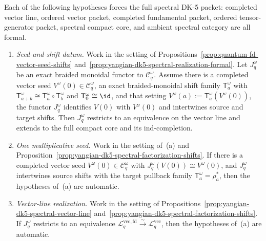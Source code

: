 \begin{corollary}
\label{cor:yangian-dk5-spectral-seed-realization}%
\label{cor:yangian-dk5-spectral-one-seed}%
\label{cor:yangian-dk5-spectral-factorization-vector-line}%
\label{cor:yangian-dk5-spectral-factorization-ambient-vector-line}%
Each of the following hypotheses forces the full spectral DK-5 packet:
completed vector line, ordered vector packet, completed fundamental
packet, ordered tensor-generator packet, spectral compact core, and
ambient spectral category are all formal.
\begin{enumerate}[label=\textup{(\alph*)}]
\item\emph{Seed-and-shift datum.}
  Work in the setting of
  Propositions~\ref{prop:quantum-fd-vector-seed-shifts}
  and~\ref{prop:yangian-dk5-spectral-realization-formal}.  Let
  \(J_q^\omega\) be an exact braided monoidal functor to
  \(\mathcal{C}_q^\omega\).  Assume there is a completed vector seed
  \(V^\omega(0)\in \mathcal{C}_q^\omega\), an exact braided-monoidal
  shift family \(\mathsf{T}_a^\omega\) with
  \(\mathsf{T}_{a+b}^\omega\cong
  \mathsf{T}_a^\omega\circ \mathsf{T}_b^\omega\) and
  \(\mathsf{T}_0^\omega\cong \id\), and that setting
  \(V^\omega(a):=\mathsf{T}_a^\omega(V^\omega(0))\), the functor
  \(J_q^\omega\) identifies \(V(0)\) with \(V^\omega(0)\) and
  intertwines source and target shifts.  Then \(J_q^\omega\) restricts
  to an equivalence on the vector line and extends to the full compact
  core and its ind-completion.

\item\emph{One multiplicative seed.}
  Work in the setting of~\textup{(a)} and
  Proposition~\ref{prop:yangian-dk5-spectral-factorization-shifts}.
  If there is a completed vector seed
  \(V^\omega(0)\in \mathcal C_q^\omega\) with
  \(J_q^\omega(V(0))\cong V^\omega(0)\), and \(J_q^\omega\)
  intertwines source shifts with the target pullback family
  \(\mathsf T_a^\omega=\rho_a^*\), then the hypotheses
  of~\textup{(a)} are automatic.

\item\emph{Vector-line realization.}
  Work in the setting of
  Propositions~\ref{prop:yangian-dk5-spectral-vector-line}
  and~\ref{prop:yangian-dk5-spectral-factorization-shifts}.
  If \(J_q^\omega\) restricts to an equivalence
  \(\mathcal L_q^{\mathrm{vec,fd}}
  \xrightarrow{\sim}
  \mathcal L_q^{\mathrm{vec}}\),
  then the hypotheses of~\textup{(a)} are automatic.


\end{enumerate}
\end{corollary}
